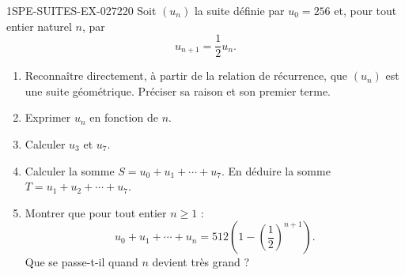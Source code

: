 \begin{exercice}{1SPE-SUITES-EX-027}{2}{20}
Soit $(u_n)$ la suite définie par $u_0=256$ et, pour tout entier naturel $n$, par
\[
u_{n+1}=\dfrac{1}{2}u_n.
\]

\begin{enumerate}
  \item Reconnaître directement, à partir de la relation de récurrence, que $(u_n)$ est une suite géométrique. Préciser sa raison et son premier terme.

  \item Exprimer $u_n$ en fonction de $n$.

  \item Calculer $u_3$ et $u_7$.

  \item Calculer la somme $S = u_0 + u_1 + \cdots + u_7$. En déduire la somme $T = u_1 + u_2 + \cdots + u_7$.

  \item Montrer que pour tout entier $n \geq 1$ :
  \[
    u_0 + u_1 + \cdots + u_n = 512\left(1 - \left(\frac{1}{2}\right)^{n+1}\right).
  \]
  Que se passe-t-il quand $n$ devient très grand ?
\end{enumerate}
\end{exercice}
